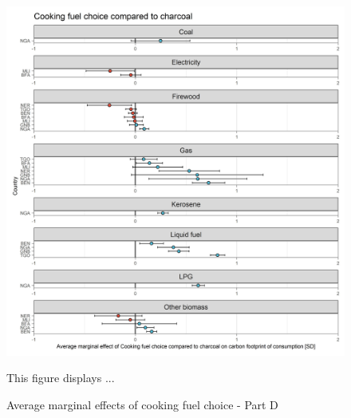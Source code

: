 \documentclass[12pt, a4paper]{article}
\newenvironment{subcaption}
{\strut
\vspace{-5pt}
\begin{minipage}[b]{0.9\textwidth}
  \hspace*{-\parindent}
  \footnotesize}
 {\end{minipage}}
\begin{document}
\begin{figure}[ht!]
  \centering
 \caption{Average marginal effects of cooking fuel choice - Part D} \label{fig:D9_Charcoal}
  \includegraphics{Analysis_OLS_ME_Carbon_Footprint/AME_OLS_FP_CF_Charcoal}
  \begin{subcaption}
    This figure displays ...
  \end{subcaption}

\end{figure}

\clearpage
\end{document}
